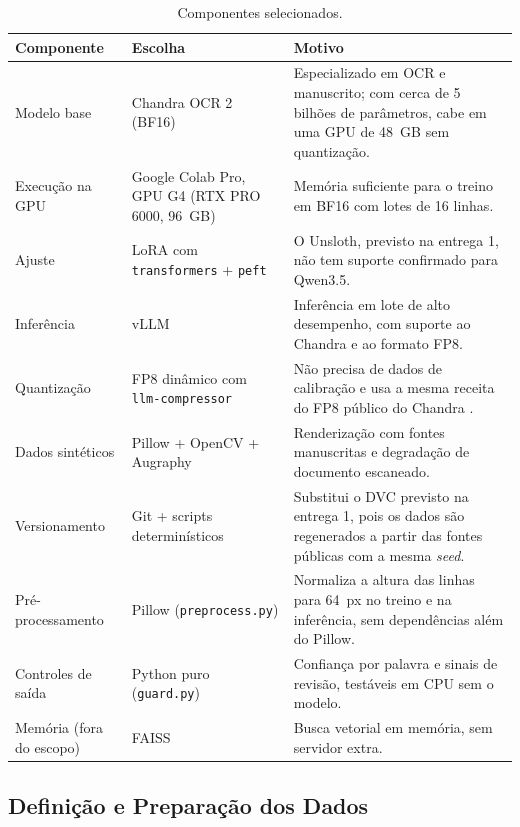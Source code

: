 \documentclass[12pt,a4paper]{article}
\begin{document}
\begin{table}[H]
\centering
\small
\begin{tabular}{@{}p{3.6cm}p{5cm}p{5.8cm}@{}}
\toprule
Componente & Escolha & Motivo \\
\midrule
Modelo base & Chandra OCR 2 (BF16) \cite{chandra2026} & Especializado em OCR e manuscrito; com cerca de 5 bilhões de parâmetros, cabe em uma GPU de 48~GB sem quantização. \\
Execução na GPU & Google Colab Pro, GPU G4 (RTX PRO 6000, 96~GB) & Memória suficiente para o treino em BF16 com lotes de 16 linhas. \\
Ajuste & LoRA com \texttt{transformers} + \texttt{peft} \cite{peft2022} & O Unsloth, previsto na entrega 1, não tem suporte confirmado para Qwen3.5. \\
Inferência & vLLM \cite{vllm2023} & Inferência em lote de alto desempenho, com suporte ao Chandra e ao formato FP8. \\
Quantização & FP8 dinâmico com \texttt{llm-compressor} \cite{llmcompressor} & Não precisa de dados de calibração e usa a mesma receita do FP8 público do Chandra \cite{chandrafp8}. \\
Dados sintéticos & Pillow + OpenCV + Augraphy \cite{augraphy2022} & Renderização com fontes manuscritas e degradação de documento escaneado. \\
Versionamento & Git + scripts determinísticos & Substitui o DVC previsto na entrega 1, pois os dados são regenerados a partir das fontes públicas com a mesma \emph{seed}. \\
Pré-processamento & Pillow (\texttt{preprocess.py}) & Normaliza a altura das linhas para 64~px no treino e na inferência, sem dependências além do Pillow. \\
Controles de saída & Python puro (\texttt{guard.py}) & Confiança por palavra e sinais de revisão, testáveis em CPU sem o modelo. \\
Memória (fora do escopo) & FAISS & Busca vetorial em memória, sem servidor extra. \\
\bottomrule
\end{tabular}
\caption{Componentes selecionados.}
\end{table}


\subsection{Definição e Preparação dos Dados}
\label{subsec:dados}
\end{document}
